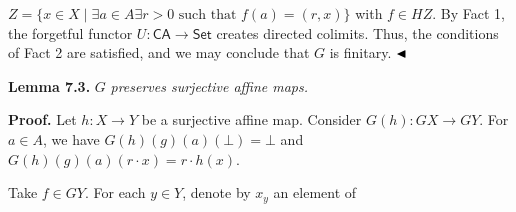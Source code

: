 \documentclass[11pt,a4paper]{amsart}
\begin{document}
\hypertarget{html:S7.SS0.SSS0.P0.SPx1.p3.m6}{}\({Z=\{x\in X\mid\exists a\in A\exists r>0\text{ such that }f(a)=(r,x)\}}\) with %
\hypertarget{html:S7.SS0.SSS0.P0.SPx1.p3.m7}{}\({f\in HZ}\). By Fact 1, the forgetful functor %
\hypertarget{html:S7.SS0.SSS0.P0.SPx1.p3.m8}{}\({U\colon\mathsf{CA}\to\mathsf{Set}}\) creates directed colimits. Thus, the conditions of Fact 2 are satisfied, and we may conclude that %
\hypertarget{html:S7.SS0.SSS0.P0.SPx1.p3.m9}{}\({G}\) is finitary. %
\hypertarget{html:S7.SS0.SSS0.P0.SPx1.p3.m10}{}\({\hfill\blacktriangleleft}\)
\par\medskip
\hypertarget{html:S7.Thmtheorem3}{} \par\noindent\textbf{\textbf{Lemma 7.3}\textbf{.}}\quad  %
\hypertarget{html:S7.Thmtheorem3.p1}{} %
\hypertarget{html:S7.Thmtheorem3.p1.m1}{}\({G}\)\emph{ preserves surjective affine maps.}
\par\medskip
\hypertarget{html:S7.SS0.SSS0.P0.SPx2}{} \par\noindent\textbf{Proof.}\quad  %
\hypertarget{html:S7.SS0.SSS0.P0.SPx2.p1}{} Let %
\hypertarget{html:S7.SS0.SSS0.P0.SPx2.p1.m1}{}\({h\colon X\to Y}\) be a surjective affine map. Consider %
\hypertarget{html:S7.SS0.SSS0.P0.SPx2.p1.m2}{}\({G(h)\colon GX\to GY}\). For %
\hypertarget{html:S7.SS0.SSS0.P0.SPx2.p1.m3}{}\({a\in A}\), we have %
\hypertarget{html:S7.SS0.SSS0.P0.SPx2.p1.m4}{}\({G(h)(g)(a)(\bot)=\bot}\) and %
\hypertarget{html:S7.SS0.SSS0.P0.SPx2.p1.m5}{}\({G(h)(g)(a)(r\cdot x)=r\cdot h(x)}\).
\par\medskip
\hypertarget{html:S7.SS0.SSS0.P0.SPx2.p2}{} Take %
\hypertarget{html:S7.SS0.SSS0.P0.SPx2.p2.m1}{}\({f\in GY}\). For each %
\hypertarget{html:S7.SS0.SSS0.P0.SPx2.p2.m2}{}\({y\in Y}\), denote by %
\hypertarget{html:S7.SS0.SSS0.P0.SPx2.p2.m3}{}\({x_{y}}\) an element of %
\end{document}
